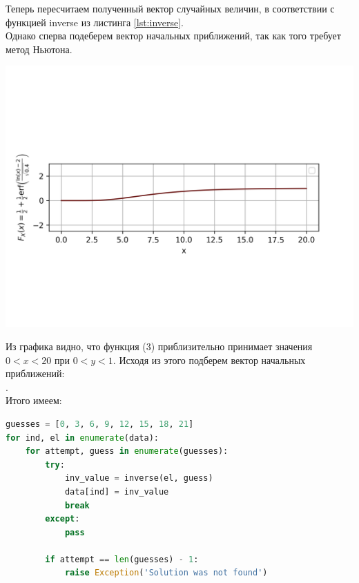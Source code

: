 \documentclass[a4paper, 14pt]{extarticle}
\begin{document}
Теперь пересчитаем полученный вектор случайных величин, в соответствии с функцией inverse из 
листинга \ref{lst:inverse}. \\
Однако сперва подеберем вектор начальных приближений, так как того требует метод Ньютона.

\vspace{-80pt}
\includegraphics[width=1\textwidth]{cdf}
\vspace{-80pt}

Из графика видно, что функция (3) приблизительно принимает значения $0 < x < 20$ при $0 < y < 1$. 
Исходя из этого подберем вектор начальных приближений: \\ \null
[0, 3, 6, 9, 12, 15, 18, 21]. \\

Итого имеем:

\begin{lstlisting}[language=Python]
guesses = [0, 3, 6, 9, 12, 15, 18, 21]
for ind, el in enumerate(data):
    for attempt, guess in enumerate(guesses):
        try: 
            inv_value = inverse(el, guess)
            data[ind] = inv_value
            break
        except:
            pass

        if attempt == len(guesses) - 1:
            raise Exception('Solution was not found')
\end{lstlisting}
\end{document}
